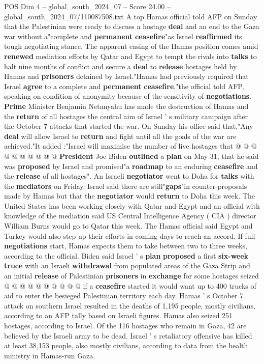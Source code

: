 \begin{textsample}{POS Dim 4 – global\_south\_2024\_07 – Score 24.00 – global\_south\_2024\_07/110087508.txt}  \label{ex:f4_pos_115}
A top Hamas official told AFP on Sunday that the Palestinian were ready to discuss a hostage \textbf{deal} and an end to the Gaza war without a"complete and \textbf{permanent} \textbf{ceasefire}"as Israel \textbf{reaffirmed} its tough negotiating stance.
The apparent easing of the Hamas position comes amid \textbf{renewed} mediation efforts by Qatar and Egypt to tempt the rivals into \textbf{talks} to halt nine months of conflict and secure a \textbf{deal} to \textbf{release} hostages held by Hamas and \textbf{prisoners} detained by Israel."Hamas had previously required that Israel \textbf{agree} to a complete and \textbf{permanent} \textbf{ceasefire},"the official told AFP, speaking on condition of anonymity because of the sensitivity of \textbf{negotiations}. \textbf{Prime} Minister Benjamin Netanyahu has made the destruction of Hamas and the \textbf{return} of all hostages the central aim of Israel ' s military campaign after the October 7 attacks that started the war.
On Sunday his office said that,"Any \textbf{deal} will allow Israel to \textbf{return} and fight until all the goals of the war are achieved."It added :"Israel will maximise the number of live hostages that @ @ @ @ @ @ @ @ @ @ \textbf{President} Joe Biden \textbf{outlined} a \textbf{plan} on May 31, that he said was \textbf{proposed} by Israel and promised"a \textbf{roadmap} to an enduring \textbf{ceasefire} and the \textbf{release} of all hostages".
An Israeli \textbf{negotiator} went to Doha for \textbf{talks} with the \textbf{mediators} on Friday.
Israel said there are still"\textbf{gaps}"in counter-proposals made by Hamas but that the \textbf{negotiator} would \textbf{return} to Doha this week.
The United States has been working closely with Qatar and Egypt and an official with knowledge of the mediation said US Central Intelligence Agency ( CIA ) director William Burns would go to Qatar this week.
The Hamas official said Egypt and Turkey would also step up their efforts in coming days to reach an accord.
If full \textbf{negotiations} start, Hamas expects them to take between two to three weeks, according to the official.
Biden said Israel ' s \textbf{plan} \textbf{proposed} a first \textbf{six-week} \textbf{truce} with an Israeli \textbf{withdrawal} from populated areas of the Gaza Strip and an initial \textbf{release} of Palestinian \textbf{prisoners} in \textbf{exchange} for some hostages seized @ @ @ @ @ @ @ @ @ @ if a \textbf{ceasefire} started it would want up to 400 trucks of aid to enter the besieged Palestinian territory each day.
Hamas ' s October 7 attack on southern Israel resulted in the deaths of 1,195 people, mostly civilians, according to an AFP tally based on Israeli figures.
Hamas also seized 251 hostages, according to Israel.
Of the 116 hostages who remain in Gaza, 42 are believed by the Israeli army to be dead.
Israel ' s retaliatory offensive has killed at least 38,153 people, also mostly civilians, according to data from the health ministry in Hamas-run Gaza.


\end{textsample}
